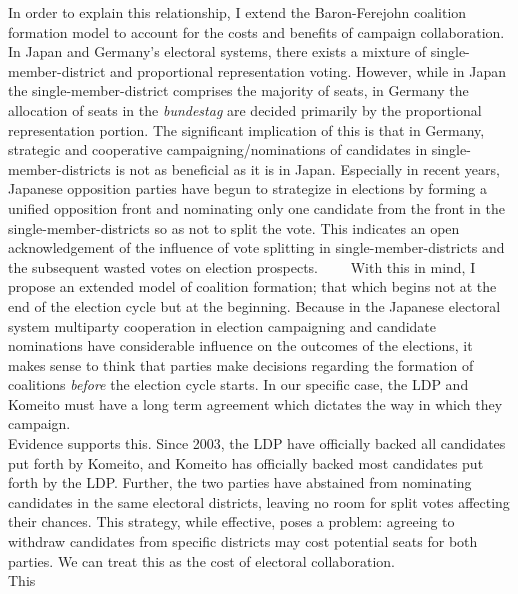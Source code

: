 \documentclass[
]{article}
\begin{document}
In order to explain this relationship, I extend the Baron-Ferejohn
coalition formation model to account for the costs and benefits of
campaign collaboration. In Japan and Germany's electoral systems, there
exists a mixture of single-member-district and proportional
representation voting. However, while in Japan the
single-member-district comprises the majority of seats, in Germany the
allocation of seats in the \emph{bundestag} are decided primarily by the
proportional representation portion. The significant implication of this
is that in Germany, strategic and cooperative campaigning/nominations of
candidates in single-member-districts is not as beneficial as it is in
Japan. Especially in recent years, Japanese opposition parties have
begun to strategize in elections by forming a unified opposition front
and nominating only one candidate from the front in the
single-member-districts so as not to split the vote. This indicates an
open acknowledgement of the influence of vote splitting in
single-member-districts and the subsequent wasted votes on election
prospects. ~~~~With this in mind, I propose an extended model of
coalition formation; that which begins not at the end of the election
cycle but at the beginning. Because in the Japanese electoral system
multiparty cooperation in election campaigning and candidate nominations
have considerable influence on the outcomes of the elections, it makes
sense to think that parties make decisions regarding the formation of
coalitions \emph{before} the election cycle starts. In our specific
case, the LDP and Komeito must have a long term agreement which dictates
the way in which they campaign.\\
\hspace*{0.333em}\hspace*{0.333em}\hspace*{0.333em}\hspace*{0.333em}Evidence
supports this. Since 2003, the LDP have officially backed all candidates
put forth by Komeito, and Komeito has officially backed most candidates
put forth by the LDP. Further, the two parties have abstained from
nominating candidates in the same electoral districts, leaving no room
for split votes affecting their chances. This strategy, while effective,
poses a problem: agreeing to withdraw candidates from specific districts
may cost potential seats for both parties. We can treat this as the cost
of electoral collaboration.\\
\hspace*{0.333em}\hspace*{0.333em}\hspace*{0.333em}\hspace*{0.333em}This
\end{document}
